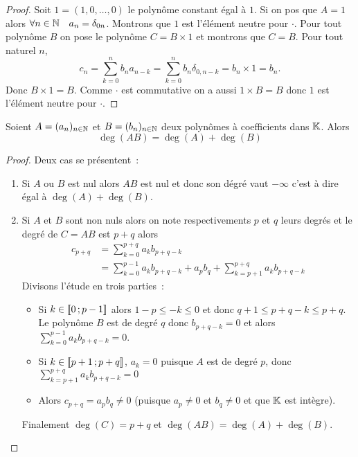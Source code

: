 \begin{proof}
  Soit \(1 = (1,0, \ldots, 0)\) le polynôme constant égal à \(1\). Si on pos que
  \(A = 1\) alors \(\forall n \in \mathbb{N} \quad a_n = \delta_{0n}\). Montrons que \(1\)
  est l'élément neutre pour \(\cdot\). Pour tout polynôme \(B\) on pose le
  polynôme \(C = B \times 1\) et montrons que \(C = B\). Pour tout naturel \(n\),
  \begin{equation}
    c_n = \sum_{k = 0}^n b_{n} a_{n-k} = \sum_{k = 0}^n b_{n} \delta_{0,n-k} = b_n
    \times 1 = b_n.
  \end{equation}
  Donc \(B \times 1 = B\). Comme \(\cdot\) est commutative on a aussi \(1 \times
  B = B\) donc \(1\) est l'élément neutre pour \(\cdot\).
\end{proof}

\begin{prop}
  Soient \(A = (a_n)_{n \in \mathbb{N}}\) et \(B = (b_n)_{n \in \mathbb{N}}\) deux polynômes à
  coefficients dans \(\mathbb{K}\). Alors
  \begin{equation}
    \deg(AB) = \deg(A)+\deg(B)
  \end{equation}
\end{prop}
\begin{proof}
  Deux cas se présentent~:
  \begin{enumerate}
    \item Si \(A\) ou \(B\) est nul alors \(AB\) est nul et donc son dégré vaut
      \(-\infty\) c'est à dire égal à \(\deg(A)+\deg(B)\).
    \item Si \(A\) et \(B\) sont non nuls alors on note respectivements \(p\) et
      \(q\) leurs degrés et le degré de \(C = AB\) est \(p+q\) alors
      \begin{align}
        c_{p+q} &= \sum_{k = 0}^{p+q} a_k b_{p+q-k} \\
        &= \sum_{k = 0}^{p-1} a_k b_{p+q-k} + a_pb_q + \sum_{k = p+1}^{p+q} a_k
        b_{p+q-k}
      \end{align}
      Divisons l'étude en trois parties~:
      \begin{itemize}
        \item     Si \(k \in \mathopen{\llbracket}0\mathclose{}\mathpunct{};p-1\mathclose{\rrbracket}\) alors \(1-p \leqslant
        -k \leqslant 0\) et donc \(q+1 \leqslant p+q-k \leqslant p+q\). Le
      polynôme \(B\) est de degré \(q\) donc \(b_{p+q-k} = 0\) et alors
    \(\sum_{k = 0}^{p-1} a_k b_{p+q-k} = 0\). \item Si \(k \in
      \mathopen{\llbracket}p+1\mathclose{}\mathpunct{};p+q\mathclose{\rrbracket}\), \(a_k =0\) puisque \(A\) est de degré
          \(p\), donc \(\sum_{k = p+1}^{p+q} a_k b_{p+q-k} = 0\)
      \item Alors \(c_{p+q} = a_pb_q \neq 0\) (puisque \(a_p \neq 0\) et \(b_q
      \neq 0\) et que \(\mathbb{K}\) est intègre). \end{itemize}
      Finalement \(\deg(C) = p+q\) et \(\deg(AB) = \deg(A) + \deg(B)\).
  \end{enumerate}
\end{proof}

